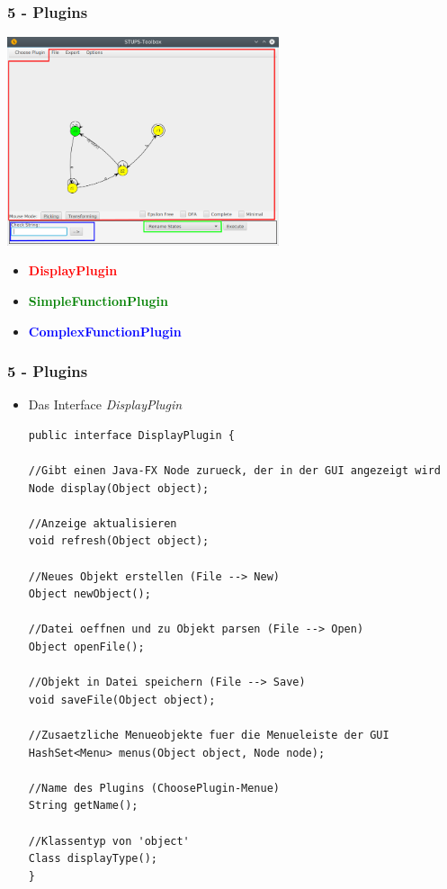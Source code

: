 \documentclass[9pt, xcolor={dvipsnames}]{beamer}
\begin{document}
\begin{frame}\frametitle{5 - Plugins}
	\begin{center}\includegraphics[width=0.6\textwidth]{fig/gui.png}\end{center}
	\begin{itemize}
		\item \textcolor{red}{\textbf{DisplayPlugin}}
		\item \textcolor{green}{\textbf{SimpleFunctionPlugin}}
		\item \textcolor{blue}{\textbf{ComplexFunctionPlugin}}
	\end{itemize}
\end{frame}

\begin{frame}[fragile]\frametitle{5 - Plugins}
	\begin{itemize}
		\item[] Das Interface \textit{DisplayPlugin}
		\begin{lstlisting}[frame=single, basicstyle=\tiny]
public interface DisplayPlugin {

//Gibt einen Java-FX Node zurueck, der in der GUI angezeigt wird
Node display(Object object);

//Anzeige aktualisieren
void refresh(Object object);

//Neues Objekt erstellen (File --> New)
Object newObject();

//Datei oeffnen und zu Objekt parsen (File --> Open)
Object openFile();

//Objekt in Datei speichern (File --> Save)
void saveFile(Object object);

//Zusaetzliche Menueobjekte fuer die Menueleiste der GUI
HashSet<Menu> menus(Object object, Node node);

//Name des Plugins (ChoosePlugin-Menue)
String getName();

//Klassentyp von 'object'
Class displayType();
}
		\end{lstlisting}
	\end{itemize}
\end{frame}
\end{document}
